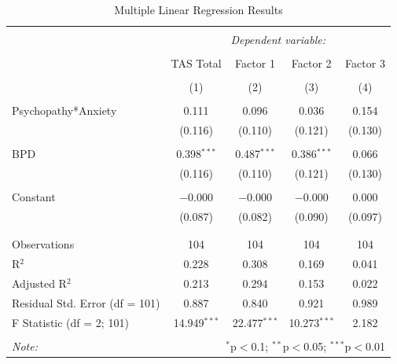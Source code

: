 \documentclass[
  man,floatsintext]{apa7}
\begin{document}
\begin{table}[!htbp] \centering 
  \caption{Multiple Linear Regression Results} 
  \label{tab:mult-regression-output} 
\begin{tabular}{@{\extracolsep{1pt}}lcccc} 
\\[-1.8ex]\hline 
\hline \\[-1.8ex] 
 & \multicolumn{4}{c}{\textit{Dependent variable:}} \\ 
\cline{2-5} 
\\[-1.8ex] & TAS Total & Factor 1 & Factor 2 & Factor 3 \\ 
\\[-1.8ex] & (1) & (2) & (3) & (4)\\ 
\hline \\[-1.8ex] 
 Psychopathy*Anxiety & 0.111 & 0.096 & 0.036 & 0.154 \\ 
  & (0.116) & (0.110) & (0.121) & (0.130) \\ 
  & & & & \\ 
 BPD & 0.398$^{***}$ & 0.487$^{***}$ & 0.386$^{***}$ & 0.066 \\ 
  & (0.116) & (0.110) & (0.121) & (0.130) \\ 
  & & & & \\ 
 Constant & $-$0.000 & $-$0.000 & $-$0.000 & 0.000 \\ 
  & (0.087) & (0.082) & (0.090) & (0.097) \\ 
  & & & & \\ 
\hline \\[-1.8ex] 
Observations & 104 & 104 & 104 & 104 \\ 
R$^{2}$ & 0.228 & 0.308 & 0.169 & 0.041 \\ 
Adjusted R$^{2}$ & 0.213 & 0.294 & 0.153 & 0.022 \\ 
Residual Std. Error (df = 101) & 0.887 & 0.840 & 0.921 & 0.989 \\ 
F Statistic (df = 2; 101) & 14.949$^{***}$ & 22.477$^{***}$ & 10.273$^{***}$ & 2.182 \\ 
\hline 
\hline \\[-1.8ex] 
\textit{Note:}  & \multicolumn{4}{r}{$^{*}$p$<$0.1; $^{**}$p$<$0.05; $^{***}$p$<$0.01} \\ 
\end{tabular} 
\end{table}
\end{document}
